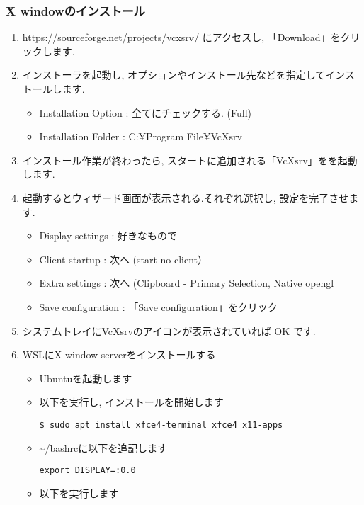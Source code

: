 \subsubsection{X windowのインストール}
\begin{enumerate}
    \item \url{https://sourceforge.net/projects/vcxsrv/} にアクセスし, 「Download」をクリックします.
    \item インストーラを起動し, オプションやインストール先などを指定してインストールします.
        \begin{itemize}
            \item Installation Option : 全てにチェックする. (Full)
            \item Installation Folder : C:¥Program File¥VcXsrv
        \end{itemize}
    \item インストール作業が終わったら, スタートに追加される「VcXsrv」をを起動します.
    \item 起動するとウィザード画面が表示される.それぞれ選択し, 設定を完了させます.
        \begin{itemize}
            \item Display settings : 好きなもので
            \item Client startup : 次へ (start no client）
            \item Extra settings : 次へ (Clipboard - Primary Selection, Native opengl
            \item Save configuration : 「Save configuration」をクリック
        \end{itemize}
    \item システムトレイにVcXsrvのアイコンが表示されていれば OK です.
    \item WSLにX window serverをインストールする
        \begin{itemize}
            \item Ubuntuを起動します
            \item 以下を実行し, インストールを開始します
                \begin{lstlisting}
$ sudo apt install xfce4-terminal xfce4 x11-apps
                \end{lstlisting}
            \item \textasciitilde/bashrcに以下を追記します
                \begin{lstlisting}
export DISPLAY=:0.0
                \end{lstlisting}
            \item 以下を実行します

\end{itemize}
\end{enumerate}
